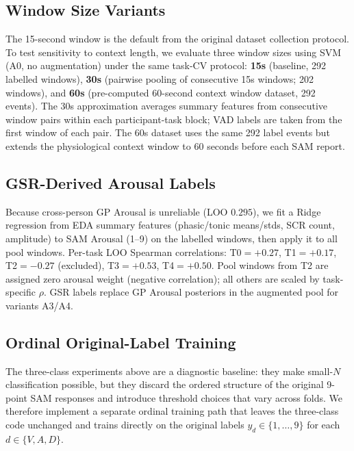 \documentclass[sigconf,review,anonymous]{acmart}
\begin{document}
\subsection{Window Size Variants}
\label{sec:window_variants}

The 15-second window is the default from the original dataset collection
protocol.
To test sensitivity to context length, we evaluate three window sizes
using SVM (A0, no augmentation) under the same task-CV protocol:
\textbf{15s} (baseline, 292 labelled windows),
\textbf{30s} (pairwise pooling of consecutive 15s windows; 202 windows),
and \textbf{60s} (pre-computed 60-second context window dataset, 292 events).
The 30s approximation averages summary features from consecutive window pairs
within each participant-task block; VAD labels are taken from the first
window of each pair.
The 60s dataset uses the same 292 label events but extends the physiological
context window to 60 seconds before each SAM report.

\subsection{GSR-Derived Arousal Labels}
\label{sec:gsr_arousal}

Because cross-person GP Arousal is unreliable (LOO $0.295$), we fit a Ridge
regression from EDA summary features (phasic/tonic means/stds, SCR count,
amplitude) to SAM Arousal (1--9) on the labelled windows, then apply it to
all pool windows.
Per-task LOO Spearman correlations: T0$=+0.27$, T1$=+0.17$, T2$=-0.27$
(excluded), T3$=+0.53$, T4$=+0.50$.
Pool windows from T2 are assigned zero arousal weight (negative correlation);
all others are scaled by task-specific $\rho$.
GSR labels replace GP Arousal posteriors in the augmented pool for variants A3/A4.

\subsection{Ordinal Original-Label Training}
\label{sec:ordinal}

The three-class experiments above are a diagnostic baseline: they make small-$N$
classification possible, but they discard the ordered structure of the original
9-point SAM responses and introduce threshold choices that vary across folds.
We therefore implement a separate ordinal training path that leaves the
three-class code unchanged and trains directly on the original labels
$y_d \in \{1,\ldots,9\}$ for each $d \in \{V,A,D\}$.
\end{document}
